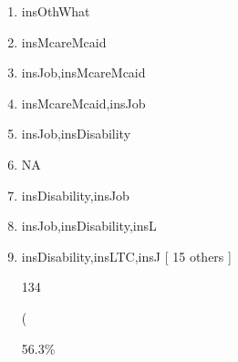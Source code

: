 \documentclass[]{article}
\providecommand{\tightlist}{%
  \setlength{\itemsep}{0pt}\setlength{\parskip}{0pt}}
\begin{document}
\begin{enumerate}
  (

  3.8\%

  )

  12

  (

  5.0\%

  )

  21

  (

  8.8\%

  )

  35

  (

  14.7\%

  )

  37

  (

  15.5\%

  )

  6

  (

  2.5\%

  )

  26

  (

  10.9\%

  )

  3

  (

  1.3\%

  )

  0 (0.0\%)

  13

  Insurance\_Aggregated {[}character{]}

  \begin{enumerate}
  \def\labelenumii{\arabic{enumii}.}
  \tightlist
  \item
    insJob
  \end{enumerate}
\item
  insOthWhat
\item
  insMcareMcaid
\item
  insJob,insMcareMcaid
\item
  insMcareMcaid,insJob
\item
  insJob,insDisability
\item
  NA
\item
  insDisability,insJob
\item
  insJob,insDisability,insL
\item
  insDisability,insLTC,insJ {[} 15 others {]}

  134

  (

  56.3\%


\end{enumerate}
\end{document}
